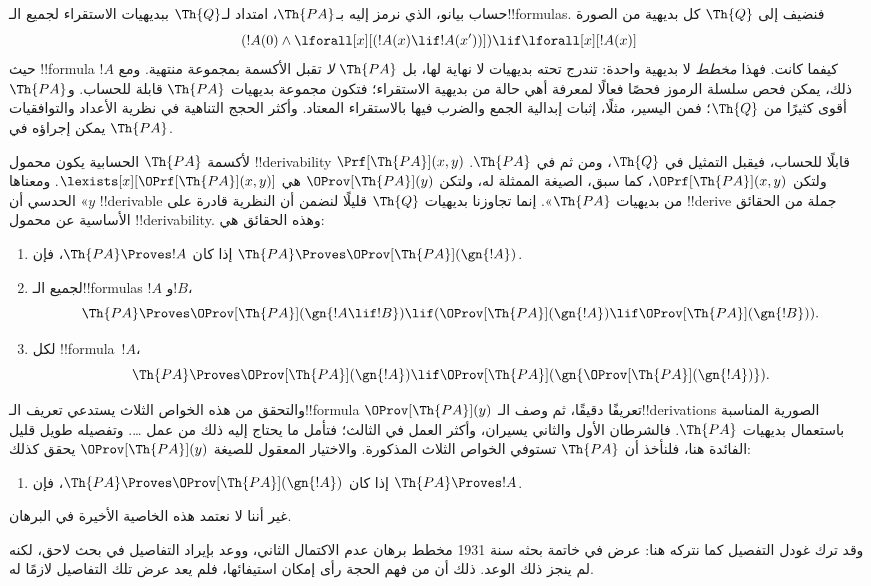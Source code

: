 \documentclass[../../../include/open-logic-section]{subfiles}
\begin{document}


حساب بيانو، الذي نرمز إليه بـ$\Th{PA}$، امتداد لـ$\Th{Q}$
ببديهيات الاستقراء لجميع الـ!!{formula}s. فنضيف إلى $\Th{Q}$
كل بديهية من الصورة
\[
(!A(0) \land \lforall[x][(!A(x) \lif !A(x'))]) \lif \lforall[x][!A(x)]
\]
حيث !!{formula} $!A$ كيفما كانت. فهذا \emph{مخطط} لا بديهية
واحدة: تندرج تحته بديهيات لا نهاية لها، بل $\Th{PA}$ {\em لا}
تقبل الأكسمة بمجموعة منتهية. ومع ذلك، يمكن فحص سلسلة الرموز
فحصًا فعالًا لمعرفة أهي حالة من بديهية الاستقراء؛ فتكون مجموعة
بديهيات $\Th{PA}$ قابلة للحساب. و$\Th{PA}$ أقوى كثيرًا من
$\Th{Q}$؛ فمن اليسير، مثلًا، إثبات إبدالية الجمع والضرب فيها
بالاستقراء المعتاد. وأكثر الحجج التناهية في نظرية الأعداد
والتوافقيات يمكن إجراؤه في $\Th{PA}$.

لأكسمة $\Th{PA}$ الحسابية يكون محمول !!{derivability}
$\Prf[\Th{PA}](x,y)$ قابلًا للحساب، فيقبل التمثيل في $\Th{Q}$،
ومن ثم في $\Th{PA}$. ولتكن $\OPrf[\Th{PA}](x,y)$، كما سبق،
الصيغة الممثلة له، ولتكن $\OProv[\Th{PA}](y)$ هي
$\lexists[x][\OPrf[\Th{PA}](x,y)]$.
ومعناها الحدسي أن «$y$ !!{derivable} من بديهيات $\Th{PA}$».
إنما تجاوزنا بديهيات $\Th{Q}$ قليلًا لنضمن أن النظرية قادرة
على !!{derive} جملة من الحقائق الأساسية عن محمول
!!{derivability}. وهذه الحقائق هي:
\begin{enumerate}
\item[P1.] إذا كان $\Th{PA}\Proves !A$، فإن
  $\Th{PA}\Proves\OProv[\Th{PA}](\gn{!A})$.
\item[P2.] لجميع الـ!!{formula}s $!A$ و$!B$،
  \[
  \Th{PA} \Proves \OProv[\Th{PA}](\gn{!A \lif !B}) \lif
  (\OProv[\Th{PA}](\gn{!A}) \lif \OProv[\Th{PA}](\gn{!B})).
  \]
\item[P3.] لكل !!{formula}~$!A$،
  \[
  \Th{PA} \Proves \OProv[\Th{PA}](\gn{!A})
  \lif \OProv[\Th{PA}](\gn{\OProv[\Th{PA}](\gn{!A})}).
  \]
\end{enumerate}
والتحقق من هذه الخواص الثلاث يستدعي تعريف الـ!!{formula}
$\OProv[\Th{PA}](y)$ تعريفًا دقيقًا، ثم وصف الـ!!{derivation}s
الصورية المناسبة باستعمال بديهيات $\Th{PA}$.
فالشرطان الأول والثاني يسيران، وأكثر العمل في الثالث؛ فتأمل ما
يحتاج إليه ذلك من عمل \dots. وتفصيله طويل قليل الفائدة هنا،
فلنأخذ أن $\Th{PA}$ تستوفي الخواص الثلاث المذكورة.
والاختيار المعقول للصيغة $\OProv[\Th{PA}](y)$ يحقق كذلك:
\begin{enumerate}
\item[P4.] إذا كان
  $\Th{PA}\Proves\OProv[\Th{PA}](\gn{!A})$، فإن
  $\Th{PA}\Proves !A$.
\end{enumerate}
غير أننا لا نعتمد هذه الخاصية الأخيرة في البرهان.

\begin{digress}
وقد ترك غودل التفصيل كما نتركه هنا: عرض في خاتمة بحثه سنة 1931
مخطط برهان عدم الاكتمال الثاني، ووعد بإيراد التفاصيل في بحث لاحق،
لكنه لم ينجز ذلك الوعد. ذلك أن من فهم الحجة رأى إمكان استيفائها،
فلم يعد عرض تلك التفاصيل لازمًا له.
\end{digress}
\end{document}
